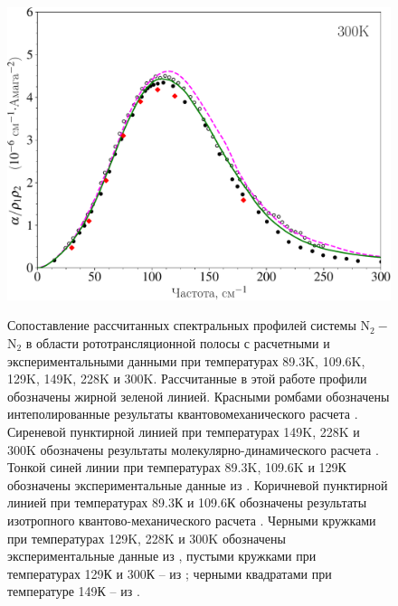 \begin{figure}[H]
    \includegraphics[width=0.49\linewidth]{./pictures/polyatom_spectra/300K_russian-crop.pdf}
    \label{fig:n2n2-spectra}
    \caption{Сопоставление рассчитанных спектральных профилей системы N$_2-$N$_2$ в области рототрансляционной полосы с расчетными и экспериментальными данными при температурах 89.3K, 109.6K, 129K, 149K, 228K и 300K. Рассчитанные в этой работе профили обозначены жирной зеленой линией. Красными ромбами обозначены интеполированные результаты квантовомеханического расчета \cite{karman2015}. Сиреневой пунктирной линией при температурах 149K, 228K и 300K обозначены результаты молекулярно-динамического расчета \cite{bussery2014}. Тонкой синей линии при температурах 89.3K, 109.6K и 129К обозначены экспериментальные данные из \cite{karman2019}. Коричневой пунктирной линией при температурах 89.3К и 109.6К обозначены результаты изотропного квантово-механического расчета \cite{borysow1986}. Черными кружками при температурах 129K, 228K и 300K обозначены экспериментальные данные из \cite{stone1984}, пустыми кружками при температурах 129К и 300К -- из \cite{buontempo1975}; черными квадратами при температуре 149К -- из \cite{dagg1985}. }  
\end{figure}

